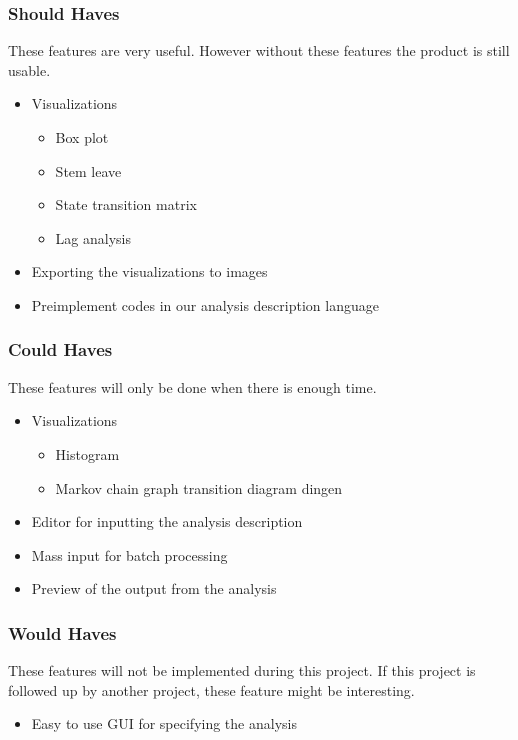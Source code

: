 \subsubsection{Should Haves}
These features are very useful. However without these features the product is still usable.
\begin{itemize}
	\item Visualizations
    \begin{itemize}
    	\item Box plot
        \item Stem leave
        \item State transition matrix
        \item Lag analysis
    \end{itemize}
	\item Exporting the visualizations to images 
    \item Preimplement  codes in our analysis description language
\end{itemize}

\subsubsection{Could Haves}
These features will only be done when there is enough time.
 \begin{itemize}
  \item Visualizations
  \begin{itemize}
	  \item Histogram
      \item Markov chain graph transition diagram dingen
  \end{itemize}
  \item Editor for inputting the analysis description 
  \item Mass input for batch processing 
  \item Preview of the output from the analysis
\end{itemize}

\subsubsection{Would Haves}
These features will not be implemented during this project. If this project is followed up by another project, these feature might be interesting.
\begin{itemize}
	\item Easy to use GUI for specifying the analysis 
\end{itemize}
